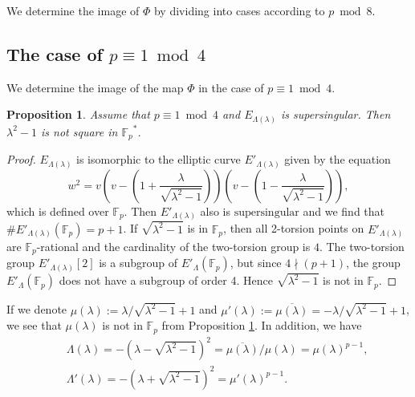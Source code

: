 \documentclass[10pt,a4paper]{amsart}
\theoremstyle{plain}
\newtheorem{prop}[defn]{Proposition}
\newcommand{\lm}{\lambda}
\newcommand{\Lm}{\Lambda}
\newcommand{\fp}{\mathbb{F}_p}
\newcommand{\fpp}{\mathbb{F}_{p^2}}
\newcommand{\super}{\text{supersingular}}
\begin{document}

    
We determine the image of $\Phi$ by dividing into cases according to $p \bmod 8$\textcolor{black}{.}

\subsection{The case of $p \equiv 1 \bmod 4$}
We determine the image of the map $\Phi$ in the case of $p \equiv 1 \bmod 4$. 
\begin{prop}
\label{propnotinfp}
    Assume that $p \equiv 1 \bmod 4$ and $E_{\Lm(\lm)}$ is supersingular. Then ${\lambda}^2-1$ is not square in ${\fp}^{*}$.
\end{prop}
\begin{proof}
    $E_{\Lm(\lm)}$ is isomorphic to the elliptic curve $E'_{\Lm(\lm)}$ given by the equation 
    \[
    w^2=v\left(v-\left(1+\frac{\lambda}{\sqrt{{\lambda}^2-1}}\right)\right) \left(v-\left(1-\frac{\lambda}{\sqrt{{\lambda}^2-1}}\right) \right),
    \] which is defined over $\fp$. Then $E'_{\Lm(\lm)}$ also is $\super$ and we find that $\# E'_{\Lm(\lm)}(\fp)=p+1$. If $\sqrt{{\lambda}^2-1}$ is in $\fp$, then all 2-torsion points on $E'_{\Lm(\lm)}$ are $\fp$-rational and the cardinality of the two-torsion group is $4$. The two-torsion group $E'_{\Lm(\lm)}[2]$ is a subgroup of $E'_{\Lm}(\fp)$, but since $4 \nmid (p+1)$, the group $E'_{\Lm}(\fp)$ does not have a subgroup of order 4. Hence $\sqrt{{\lambda}^2-1}$ is not in $\fp$.
\end{proof}


If we denote $\mu(\lm):={\lambda}/{\sqrt{{\lambda}^2-1}}+1$ and $ {\mu}'(\lm):=\overline{\mu(\lm)}={-\lambda}/{\sqrt{{\lambda}^2-1}}+1$, we see that $\mu(\lm)$ is not in $\fp$ from Proposition \ref{propnotinfp}. In addition, we have
\begin{eqnarray*}
  &&  \Lm(\lm)=-(\lambda-\sqrt{{\lambda}^2-1})^2=\overline{\mu(\lm)} / \mu(\lm)={\mu(\lm)}^{p-1},\\
  &&  {\Lm}'(\lm)=-(\lambda+\sqrt{{\lambda}^2-1})^2={{\mu}'(\lm)}^{p-1}.
\end{eqnarray*}
\end{document}
